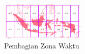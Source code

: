 \begin{figure}[H]
	\includegraphics[width=4cm]{figures/1154016/peta.png}
	\centering
	\caption{Pembagian Zona Waktu}
\end{figure}


